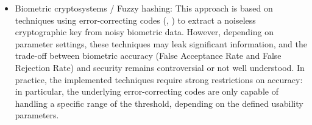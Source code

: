 \begin{itemize}
\item Biometric cryptosystems / Fuzzy hashing: This approach is based on techniques using error-correcting codes (\cite{uludag2004biometric}, \cite{nagar2010hybrid}) to extract a noiseless cryptographic key from noisy biometric data. However, depending on parameter settings, these techniques may leak significant information, and the trade-off between biometric accuracy (False Acceptance Rate and False Rejection Rate) and security remains controversial or not well understood. In practice, the implemented techniques require strong restrictions on accuracy: in particular, the underlying error-correcting codes are only capable of handling a specific range of the threshold, depending on the defined usability parameters.


\end{itemize}
